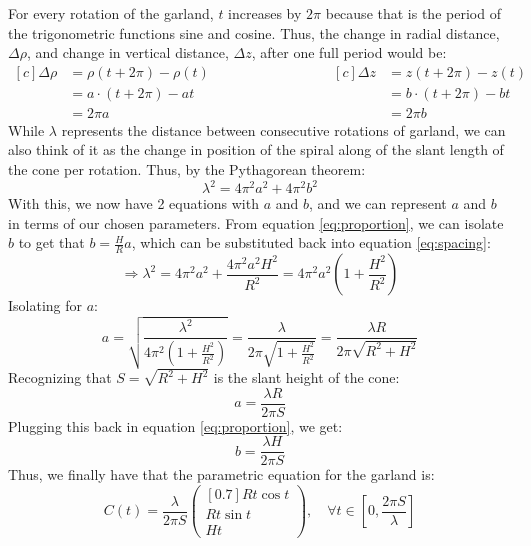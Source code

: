 For every rotation of the garland, $t$ increases by $2\pi$ because that is the period of the trigonometric functions sine and cosine. Thus, the change in radial distance, $\Delta \rho$, and change in vertical distance, $\Delta z$, after one full period would be:
\begin{equation*}
    \begin{aligned}[c]
        \Delta \rho & = \rho(t+2\pi) -\rho(t) \\
                    & = a\cdot(t+2\pi) - at   \\
                    & = 2\pi a
    \end{aligned}
    \qquad\qquad\qquad\qquad
    \begin{aligned}[c]
        \Delta z & = z(t+2\pi) -z(t)     \\
                 & = b\cdot(t+2\pi) - bt \\
                 & = 2\pi b
    \end{aligned}
\end{equation*}
While $\lambda$ represents the distance between consecutive rotations of garland, we can also think of it as the change in position of the spiral along of the slant length of the cone per rotation. Thus, by the Pythagorean theorem:
\begin{equation}
    \lambda^2 = 4\pi^2a^2+4\pi^2b^2 \label{eq:spacing}
\end{equation}
With this, we now have 2 equations with $a$ and $b$, and we can represent $a$ and $b$ in terms of our chosen parameters. From equation \ref{eq:proportion}, we can isolate $b$ to get that $b = \frac{H}{R}a$, which can be substituted back into equation \ref{eq:spacing}:
\begin{equation*}
    \Rightarrow \lambda^2 = 4\pi^2a^2+\frac{4\pi^2a^2H^2}{R^2}  = 4\pi^2a^2\left(1+\frac{H^2}{R^2} \right)
\end{equation*}
\bulletarrow Isolating for $a$:
\begin{equation*}
    a = \sqrt{\frac{\lambda^2}{4\pi^2(1+\frac{H^2}{R^2})}} = \frac{\lambda}{2\pi\sqrt{1+\frac{H^2}{R^2}}} = \frac{\lambda R}{2\pi\sqrt{R^2+H^2}}
\end{equation*}
\bulletarrow Recognizing that $S=\sqrt{R^2+H^2}$ is the slant height of the cone:
\begin{equation}
    a =\frac{\lambda R}{2\pi S}
\end{equation}
\bulletarrow Plugging this back in equation \ref{eq:proportion}, we get:\begin{equation}
    b =\frac{\lambda H}{2\pi S}
\end{equation}
Thus, we finally have that the parametric equation for the garland is:
\begin{equation}
    C(t) = \frac{\lambda}{2\pi S}
    \begin{pmatrix}[0.7]
        Rt\cos{t} \\
        Rt\sin{t} \\
        Ht
    \end{pmatrix}, \quad \forall t \in \left[0, \frac{2\pi S}{\lambda}\right]
\end{equation}
